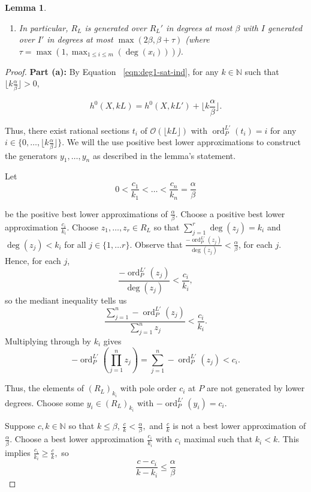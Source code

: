 \documentclass{amsart}
\theoremstyle{plain}
\newtheorem{lem}[thm]{Lemma}
\theoremstyle{definition}
\theoremstyle{remark}
\numberwithin{equation}{section}
\newcommand\BN{{\mathbb N}}
\newcommand\sco{{\mathscr O}}
\DeclareMathOperator{\ord}{ord}
\newcommand{\halfcan}{L}
\begin{document}
\begin{lem}
\begin{enumerate}
\item[(c)] In particular, $R_\halfcan$ is generated over $R_\halfcan'$
	in degrees at most $\beta$ with $I$ generated over $I'$ in
	degrees at most $\max(2 \beta, \beta + \tau)$ (where $\tau = \max(1,
	\max_{1 \leq i \leq m}(\deg(x_i)))$).
\end{enumerate}
\end{lem}

\begin{proof}
{\bf Part (a):}
By
Equation ~\ref{eqn:deg1-sat-ind}, for any $k
\in \BN$ such that $\lfloor k \frac{ \alpha}{\beta} \rfloor > 0$,

\[
	h^0 (X, k \halfcan ) = h^0(X, k \halfcan') + \lfloor k \frac{\alpha}{\beta}\rfloor.
\]

\noindent
Thus, there exist rational sections $t_i$ of $\sco(\lfloor k \halfcan \rfloor)$ with $\ord_P^{L'}(t_i) = i$
for any $i \in \{0, \ldots, \lfloor k \frac{\alpha}{
\beta} \rfloor \}$. We will the use positive best lower approximations to
construct the generators $y_1, \ldots, y_n$ as described in the lemma's statement.

Let 
\[
	0 < \frac{c_1}{k_1} < \ldots < \frac{c_n}{k_n} = \frac{\alpha}{
	\beta}
\]

\noindent
be the positive best lower approximations of $\frac{\alpha}{\beta}$. 
Choose a positive best lower approximation $\frac{c_i}{k_i}$.  Choose $z_1, \ldots, z_r \in R_\halfcan$ so that $\sum_{j=1}^r \deg(z_j) = k_i$ and $\deg(z_j)<k_i$ for all $j\in \{1, \ldots r\}$. Observe that $\frac{-\ord_P^{\halfcan'}(z_j)}{\deg(z_j)}< \frac{\alpha}{\beta}$, for each $j$.  Hence, for each $j$, 
\[
	\frac{-\ord_P^{\halfcan'}(z_j)}{\deg(z_j)} < \frac{c_i}{k_i},
\]
so the mediant inequality tells us
\[
	\frac{\sum_{j=1}^n -\ord^{\halfcan'}_P(z_j)}{\sum_{j=1}^n z_j } < \frac{c_i}{k_i}.
\]
Multiplying through by $k_i$ gives
\[
	-\ord^{\halfcan'}_P \left(\prod_{j=1}^n z_j \right) = \sum_{j=1}^n -\ord^{\halfcan'}_P(z_j) < c_i .
\]

\noindent
Thus, the elements of $(R_{\halfcan})_{k_i}$ with pole order $c_i$ at $P$ are not generated by 
lower degrees. 
Choose some $y_i \in(R_{
\halfcan})_{k_i}$ with $-\ord_{P}^{L'}(y_i)=c_i$.

Suppose $c,k \in \BN$ so that $k \le \beta$,  $\frac{c}{k} < \frac{\alpha}{
\beta},$ and $\frac{c}{k}$ is not a best lower approximation of $\frac{\alpha}{\beta}$. Choose a
best lower approximation $\frac{c_i}{k_i}$ with $c_i$ maximal such that $k_i< k$.  This implies $\frac{c_i}{k_i}\ge \frac{c}{k},$ so
\[
	\frac{c-c_i}{k-k_i}\le \frac{\alpha}{\beta}
\]


\end{proof}
\end{document}
